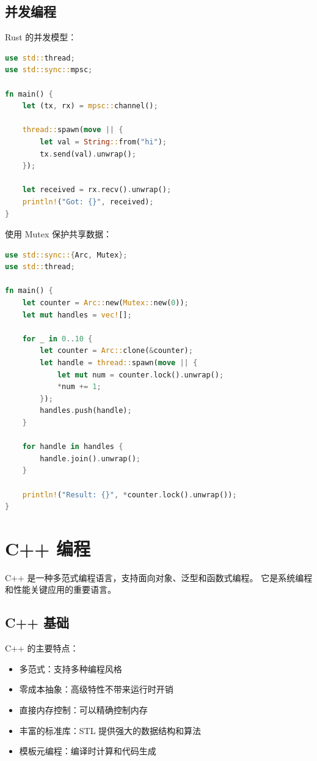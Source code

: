 \subsection{并发编程}


Rust 的并发模型：

\begin{lstlisting}[language=Rust]
use std::thread;
use std::sync::mpsc;

fn main() {
    let (tx, rx) = mpsc::channel();

    thread::spawn(move || {
        let val = String::from("hi");
        tx.send(val).unwrap();
    });

    let received = rx.recv().unwrap();
    println!("Got: {}", received);
}
\end{lstlisting}

使用 Mutex 保护共享数据：

\begin{lstlisting}[language=Rust]
use std::sync::{Arc, Mutex};
use std::thread;

fn main() {
    let counter = Arc::new(Mutex::new(0));
    let mut handles = vec![];

    for _ in 0..10 {
        let counter = Arc::clone(&counter);
        let handle = thread::spawn(move || {
            let mut num = counter.lock().unwrap();
            *num += 1;
        });
        handles.push(handle);
    }

    for handle in handles {
        handle.join().unwrap();
    }

    println!("Result: {}", *counter.lock().unwrap());
}
\end{lstlisting}

\section{C++ 编程}

C++ 是一种多范式编程语言，支持面向对象、泛型和函数式编程。
它是系统编程和性能关键应用的重要语言。

\subsection{C++ 基础}


C++ 的主要特点：
\begin{itemize}
  \item 多范式：支持多种编程风格
  \item 零成本抽象：高级特性不带来运行时开销
  \item 直接内存控制：可以精确控制内存
  \item 丰富的标准库：STL 提供强大的数据结构和算法
  \item 模板元编程：编译时计算和代码生成
\end{itemize}

